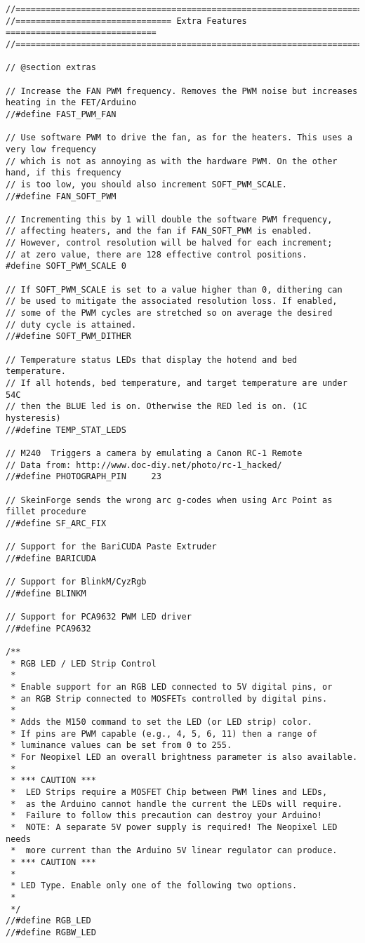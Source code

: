 \begin{lstlisting}[caption = キャプション, label = ラベル]
//=============================================================================
//=============================== Extra Features ==============================
//=============================================================================

// @section extras

// Increase the FAN PWM frequency. Removes the PWM noise but increases heating in the FET/Arduino
//#define FAST_PWM_FAN

// Use software PWM to drive the fan, as for the heaters. This uses a very low frequency
// which is not as annoying as with the hardware PWM. On the other hand, if this frequency
// is too low, you should also increment SOFT_PWM_SCALE.
//#define FAN_SOFT_PWM

// Incrementing this by 1 will double the software PWM frequency,
// affecting heaters, and the fan if FAN_SOFT_PWM is enabled.
// However, control resolution will be halved for each increment;
// at zero value, there are 128 effective control positions.
#define SOFT_PWM_SCALE 0

// If SOFT_PWM_SCALE is set to a value higher than 0, dithering can
// be used to mitigate the associated resolution loss. If enabled,
// some of the PWM cycles are stretched so on average the desired
// duty cycle is attained.
//#define SOFT_PWM_DITHER

// Temperature status LEDs that display the hotend and bed temperature.
// If all hotends, bed temperature, and target temperature are under 54C
// then the BLUE led is on. Otherwise the RED led is on. (1C hysteresis)
//#define TEMP_STAT_LEDS

// M240  Triggers a camera by emulating a Canon RC-1 Remote
// Data from: http://www.doc-diy.net/photo/rc-1_hacked/
//#define PHOTOGRAPH_PIN     23

// SkeinForge sends the wrong arc g-codes when using Arc Point as fillet procedure
//#define SF_ARC_FIX

// Support for the BariCUDA Paste Extruder
//#define BARICUDA

// Support for BlinkM/CyzRgb
//#define BLINKM

// Support for PCA9632 PWM LED driver
//#define PCA9632

/**
 * RGB LED / LED Strip Control
 *
 * Enable support for an RGB LED connected to 5V digital pins, or
 * an RGB Strip connected to MOSFETs controlled by digital pins.
 *
 * Adds the M150 command to set the LED (or LED strip) color.
 * If pins are PWM capable (e.g., 4, 5, 6, 11) then a range of
 * luminance values can be set from 0 to 255.
 * For Neopixel LED an overall brightness parameter is also available.
 *
 * *** CAUTION ***
 *  LED Strips require a MOSFET Chip between PWM lines and LEDs,
 *  as the Arduino cannot handle the current the LEDs will require.
 *  Failure to follow this precaution can destroy your Arduino!
 *  NOTE: A separate 5V power supply is required! The Neopixel LED needs
 *  more current than the Arduino 5V linear regulator can produce.
 * *** CAUTION ***
 *
 * LED Type. Enable only one of the following two options.
 *
 */
//#define RGB_LED
//#define RGBW_LED


\end{lstlisting}
